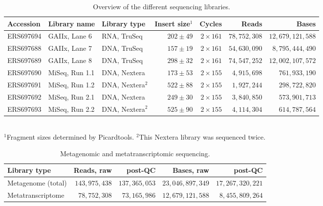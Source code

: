 \documentclass{bmcart}
\begin{document}
\begin{backmatter}
\begin{table}[h!]
\caption{Overview of the different sequencing libraries.}
\begin{tabular}{lllrrrr}
\hline
Accession & Library name & Library type & Insert size$^{1}$ & Cycles & Reads & Bases \\
\hline
ERS697694 & GAIIx, Lane 6 & RNA, TruSeq & $202 \pm 49$ & $2 \times 161$ & $78,752,308$ & $12,679,121,588$ \\
ERS697688 & GAIIx, Lane 7 & DNA, TruSeq & $157 \pm 19$ & $2 \times 161$ & $54,630,090$ & $8,795,444,490$ \\
ERS697689 & GAIIx, Lane 8 & DNA, TruSeq & $298 \pm 32$ & $2 \times 161$ & $74,547,252$ & $12,002,107,572$ \\
ERS697690 & MiSeq, Run 1.1 & DNA, Nextera & $173 \pm 53$ & $2 \times 155$ & $4,915,698$ & $761,933,190$ \\
ERS697691 & MiSeq, Run 1.2 & DNA, Nextera$^{2}$ & $522 \pm 88$ & $2 \times 155$ & $1,927,244$ & $298,722,820$ \\
ERS697692 & MiSeq, Run 2.1 & DNA, Nextera & $249 \pm 30$ & $2 \times 155$ & $3,840,850$ & $573,901,713$ \\
ERS697693 & MiSeq, Run 2.2 & DNA, Nextera$^{2}$ & $525 \pm 90$ & $2 \times 155$ & $4,114,304$ & $614,787,564$ \\
\hline
\end{tabular}
\label{tReads}
\\$^{1}$Fragment sizes determined by Picardtools. $^{2}$This Nextera library was sequenced twice.
\end{table}

\begin{table}[h!]
\caption{Metagenomic and metatranscriptomic sequencing.}
\begin{tabular}{lrrrr}
\hline
Library type & Reads, raw & post-QC & Bases, raw & post-QC\\
\hline
Metagenome (total) & $143,975,438$ & $137,365,053$ & $23,046,897,349$ & $17,267,320,221$ \\
Metatranscriptome & $78,752,308$ & $73,165,986$ & $12,679,121,588$ & $8,455,809,264$ \\
\hline
\end{tabular}
\label{tPostQC}
\end{table}


\end{backmatter}
\end{document}
